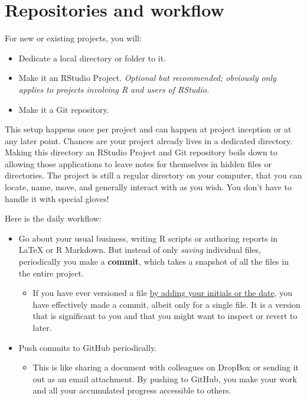 \documentclass[12pt]{article}
\providecommand{\tightlist}{%
  \setlength{\itemsep}{0pt}\setlength{\parskip}{0pt}}
\begin{document}
\section{Repositories and workflow}\label{repositories-and-workflow}

For new or existing projects, you will:

\begin{itemize}
\tightlist
\item
  Dedicate a local directory or folder to it.
\item
  Make it an RStudio Project. \emph{Optional but recommended; obviously
  only applies to projects involving R and users of RStudio.}
\item
  Make it a Git repository.
\end{itemize}

This setup happens once per project and can happen at project inception
or at any later point. Chances are your project already lives in a
dedicated directory. Making this directory an RStudio Project and Git
repository boils down to allowing those applications to leave notes for
themselves in hidden files or directories. The project is still a
regular directory on your computer, that you can locate, name, move, and
generally interact with as you wish. You don't have to handle it with
special gloves!

Here is the daily workflow:

\begin{itemize}
\tightlist
\item
  Go about your usual business, writing R scripts or authoring reports
  in LaTeX or R Markdown. But instead of only \emph{saving} individual
  files, periodically you make a \textbf{commit}, which takes a snapshot
  of all the files in the entire project.

  \begin{itemize}
  \tightlist
  \item
    If you have ever versioned a file
    \href{http://www.phdcomics.com/comics/archive.php?comicid=1531}{by
    adding your initials or the date}, you have effectively made a
    commit, albeit only for a single file. It is a version that is
    significant to you and that you might want to inspect or revert to
    later.
  \end{itemize}
\item
  Push commits to GitHub periodically.

  \begin{itemize}
  \tightlist
  \item
    This is like sharing a document with colleagues on DropBox or
    sending it out as an email attachment. By pushing to GitHub, you
    make your work and all your accumulated progress accessible to
    others.
  \end{itemize}
\end{itemize}
\end{document}
